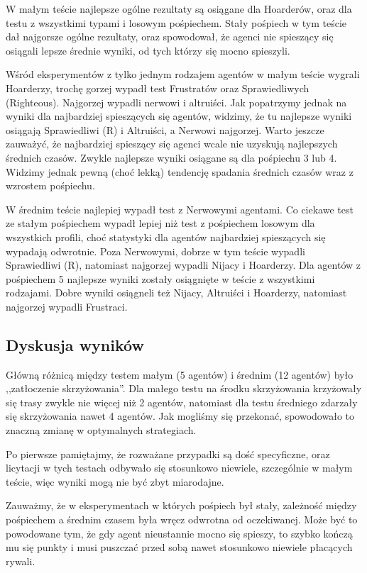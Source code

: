 \documentclass[11pt]{article}
\begin{document}
W małym teście najlepsze ogólne rezultaty są osiągane dla Hoarderów, oraz dla testu z wszystkimi typami i losowym pośpiechem. Stały pośpiech w tym teście dał najgorsze ogólne rezultaty, oraz spowodował, że agenci nie spieszący się osiągali lepsze średnie wyniki, od tych którzy się mocno spieszyli. 

Wśród eksperymentów z tylko jednym rodzajem agentów w małym teście wygrali Hoarderzy, trochę gorzej wypadł test Frustratów oraz Sprawiedliwych (Righteous). Najgorzej wypadli nerwowi i altruiści. Jak popatrzymy jednak na wyniki dla najbardziej spieszących się agentów, widzimy, że tu najlepsze wyniki osiągają Sprawiedliwi (R) i Altruiści, a Nerwowi najgorzej. Warto jeszcze zauważyć, że najbardziej spieszący się agenci wcale nie uzyskują najlepszych średnich czasów. Zwykle najlepsze wyniki osiągane są dla pośpiechu 3 lub 4. Widzimy jednak pewną (choć lekką) tendencję spadania średnich czasów wraz z wzrostem pośpiechu.

W średnim teście najlepiej wypadł test z Nerwowymi agentami. Co ciekawe test ze stałym pośpiechem wypadł lepiej niż test z pośpiechem losowym dla wszystkich profili, choć statystyki dla agentów najbardziej spieszących się wypadają odwrotnie. Poza Nerwowymi, dobrze w tym teście wypadli Sprawiedliwi (R), natomiast najgorzej wypadli Nijacy i Hoarderzy. Dla agentów z pośpiechem 5 najlepsze wyniki zostały osiągnięte w teście z wszystkimi rodzajami. Dobre wyniki osiągneli też Nijacy, Altruiści i Hoarderzy, natomiast najgorzej wypadli Frustraci.

\subsection{Dyskusja wyników}
Główną różnicą między testem małym (5 agentów) i średnim (12 agentów) było ,,zatłoczenie skrzyżowania''. Dla małego testu na środku skrzyżowania krzyżowały się trasy zwykle nie więcej niż 2 agentów, natomiast dla testu średniego zdarzały się skrzyżowania nawet 4 agentów. Jak mogliśmy się przekonać, spowodowało to znaczną zmianę w optymalnych strategiach.

Po pierwsze pamiętajmy, że rozważane przypadki są dość specyficzne, oraz licytacji w tych testach odbywało się stosunkowo niewiele, szczególnie w małym teście, więc wyniki mogą nie być zbyt miarodajne.

Zauważmy, że w eksperymentach w których pośpiech był stały, zależność między pośpiechem a średnim czasem była wręcz odwrotna od oczekiwanej. Może być to powodowane tym, że gdy agent nieustannie mocno się spieszy, to szybko kończą mu się punkty i musi puszczać przed sobą nawet stosunkowo niewiele płacących rywali.
\end{document}
